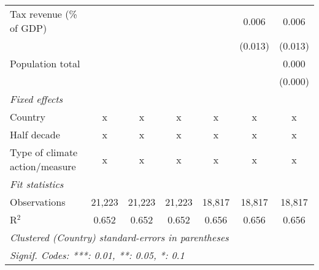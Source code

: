 \begin{tabular}{lcccccc}
   Tax revenue (\% of GDP)                                &               &               &               &               & 0.006         & 0.006\\   
                                                          &               &               &               &               & (0.013)       & (0.013)\\   
   Population total                                       &               &               &               &               &               & 0.000\\   
                                                          &               &               &               &               &               & (0.000)\\   
   \emph{Fixed effects}\\
   Country                                                & x             & x             & x             & x             & x             & x\\  
   Half decade                                            & x             & x             & x             & x             & x             & x\\  
   Type of climate action/measure                         & x             & x             & x             & x             & x             & x\\  
   \midrule \emph{Fit statistics}\\
   Observations                                           & 21,223        & 21,223        & 21,223        & 18,817        & 18,817        & 18,817\\  
   R$^2$                                                  & 0.652         & 0.652         & 0.652         & 0.656         & 0.656         & 0.656\\  
   \midrule
   \multicolumn{7}{l}{\emph{Clustered (Country) standard-errors in parentheses}}\\
   \multicolumn{7}{l}{\emph{Signif. Codes: ***: 0.01, **: 0.05, *: 0.1}}\\
\end{tabular}
\par\endgroup


